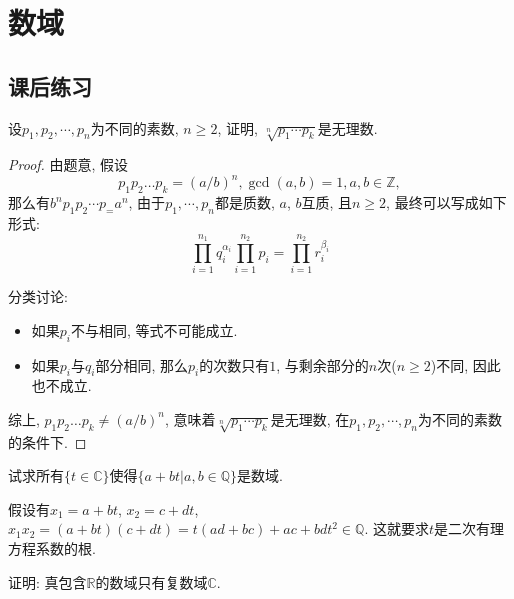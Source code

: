 


    \section{数域}
    
    \subsection{课后练习}

    \begin{prob}
        设$p_1, p_2, \cdots, p_n$为不同的素数, $n\geq 2$, 证明, $\sqrt[n]{p_1\cdots p_k}$是无理数. 
    \end{prob}

    \begin{proof}
        由题意, 假设
        $$
        p_1p_2\dots p_k = (a/b)^n, \gcd(a, b) =1, a, b\in \mathbb{Z},
        $$
        那么有$b^np_1p_2\cdots p_=a^n$, 由于$p_1,\cdots, p_n$都是质数, $a$, $b$互质, 且$n\geq 2$, 最终可以写成如下形式:
        $$
        \prod_{i=1}^{n_1} q_i^{\alpha_i} \prod_{i=1}^{n_2} p_i = \prod_{i=1}^{n_2} r_i^{\beta_i}
        $$

        分类讨论: 

        \begin{itemize}
            \item 如果$p_i$不与相同, 等式不可能成立.  
            \item 如果$p_i$与$q_i$部分相同, 那么$p_i$的次数只有$1$, 与剩余部分的$n$次($n\geq 2$)不同, 因此也不成立.  
        \end{itemize}

        综上, $p_1p_2\dots p_k \neq (a/b)^n$, 意味着$\sqrt[n]{p_1\cdots p_k}$是无理数, 在$p_1, p_2, \cdots, p_n$为不同的素数的条件下. 
    \end{proof}

    \begin{prob}
        试求所有$\{t\in \mathbb{C}\}$使得$\{a+bt|a,b\in \mathbb{Q}\}$是数域.
    \end{prob}

    \begin{sol}
        假设有$x_1=a+bt$, $x_2=c+dt$, $x_1x_2=(a+bt)(c+dt)=t (a d+b c)+a c+b d t^2 \in \mathbb{Q}$. 这就要求$t$是二次有理方程系数的根.  
    \end{sol}

    \begin{prob}
        证明: 真包含$\mathbb{R}$的数域只有复数域$\mathbb{C}$.
    \end{prob}

